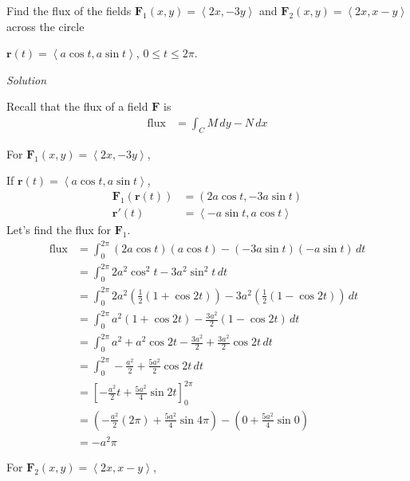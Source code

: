 \documentclass{article}
\newcommand{\lrp}[1]{\left( #1 \right)}
\newcommand{\lra}[1]{\left\langle #1 \right\rangle}
\newcommand{\lrb}[1]{\left[ #1 \right]}
\renewcommand{\r}[0]{\mathbf{r}}
\newcommand{\F}[0]{\mathbf{F}}
\newcommand{\Solution}{\textit{Solution}}
\begin{document}
Find the flux of the fields $\F_1(x,y)=\lra{2x,-3y}$ and $\F_2(x,y)=\lra{2x,x-y}$ across the circle 

$\r(t)=\lra{a\cos t, a\sin t}$, $0\leq t \leq 2\pi$.

\Solution

Recall that the flux of a field $\F$ is
\begin{align*}
    \text{flux}&=\int_C M\,dy - N\,dx
\end{align*}

{}

For $\F_1(x,y)=\lra{2x,-3y}$,

If $\r(t)=\lra{a\cos t,a\sin t}$,
\begin{align*}
    \F_1 \lrp{\r(t)}&=\lrp{2a\cos t,-3a\sin t}\\
    \r'(t)&=\lra{-a\sin t, a \cos t}
\end{align*}
Let's find the flux for $\F_1$.
\begin{align*}
    \text{flux}&=\int_0^{2\pi} \lrp{2a\cos t}\lrp{a \cos t}-\lrp{-3a\sin t}\lrp{-a \sin t}\,dt\\
    &=\int_0^{2\pi} 2a^2 \cos ^2 t - 3a^2 \sin ^2 t\,dt\\
    &=\int_0^{2\pi} 2a^2 \lrp{\frac{1}{2}(1+\cos 2t)}-3a^2\lrp{\frac{1}{2}(1-\cos 2t)}\,dt\tag{see note below}\\
    &=\int_0^{2\pi}a^2(1+\cos 2t) -\frac{3a^2}{2}(1-\cos 2t)\,dt\\
    &=\int_0^{2\pi} a^2 +a^2\cos 2t - \frac{3a^2}{2}+\frac{3a^2}{2}\cos 2t\,dt\\
    &=\int_0^{2\pi} -\frac{a^2}{2}+\frac{5a^2}{2}\cos 2t\,dt\\
    &=\lrb{-\frac{a^2}{2}t+\frac{5a^2}{4}\sin 2t}_0^{2\pi}\\
    &=\lrp{-\frac{a^2}{2}(2\pi) +\frac{5a^2}{4}\sin 4\pi}-\lrp{0+\frac{5a^2}{4}\sin 0}\\
    &=-a^2\pi
\end{align*}

{}

For $\F_2(x,y)=\lra{2x,x-y}$,
\end{document}
